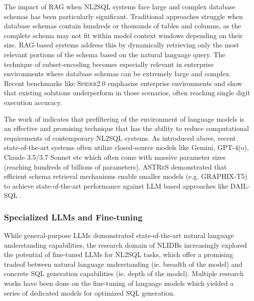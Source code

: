 \documentclass{article}
\begin{document}
The impact of RAG when NL2SQL systems face large and complex database schemas has been particularly significant. Traditional
approaches struggle when database schemas contain hundreds or thousands of tables and columns, as the complete schema may not
fit within model context windows depending on their size. RAG-based systems address this by dynamically retrieving only the most
relevant portions of the schema based on the natural language query. The technique of subset-encoding becomes especially relevant
in enterprise environments where database schemas can be extremely large and complex. Recent benchmarks like \textsc{Spider2.0}
emphasize enterprise environments and show that existing solutions underperform in those scenarios, often reaching single digit
execution accuracy.

The work of \citeauthor{RetAug} indicates that prefiltering of the environment of language models is an effective
and promising technique that has the ability to reduce computational requirements of contemporary NL2SQL systems.
As introduced above, recent state-of-the-art systems often utilize closed-source models like Gemini, GPT-4(o), Claude 3.5/3.7
Sonnet etc which often come with massive parameter sizes (reaching hundreds of billions of parameters). \textsc{ASTReS}
demonstrated that efficient schema retrieval mechanisms enable smaller models (e.g. GRAPHIX-T5) to achieve state-of-the-art
performance against LLM based approaches like DAIL-SQL \citep{DAIL-SQL, RetAug}.

\subsubsection{Specialized LLMs and Fine-tuning}

While general-purpose LLMs demonstrated state-of-the-art natural language understanding capabilities, the research
domain of NLIDBs increasingly explored the potential of fine-tuned LLMs for NL2SQL tasks, which offer a promising
tradeof between natural language understanding (ie. breadth of the model) and concrete SQL generation capabilities
(ie. depth of the model). Multiple research works have been done on the fine-tuning of language models which
yielded a series of dedicated models for optimized SQL generation.
\end{document}
